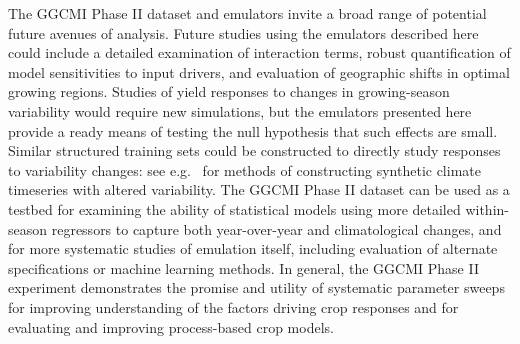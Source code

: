 \documentclass[gmdd]{copernicus} %
\begin{document}
The GGCMI Phase II dataset and emulators invite a broad range of potential future avenues of analysis.
Future studies using the emulators described here could include a detailed examination of interaction terms, robust quantification of model sensitivities to input drivers, and evaluation of geographic shifts in optimal growing regions. Studies of yield responses to changes in growing-season variability would require new simulations, but the emulators presented here provide a ready means of testing the null hypothesis that such effects are small.  Similar structured training sets could be constructed to directly study responses to variability changes: see e.g.\ \citet{poppick2016, Haugen2018} for methods of constructing synthetic climate timeseries with altered variability. 
 The GGCMI Phase II dataset can be used as a testbed for examining the ability of statistical models using more detailed within-season regressors to capture both year-over-year and climatological changes, and for more systematic 
studies of emulation itself, including evaluation of alternate specifications or machine learning methods. %
In general, the GGCMI Phase II experiment demonstrates the promise and utility of systematic parameter sweeps for improving understanding of the factors driving crop responses and for evaluating and improving process-based crop models.
\end{document}
